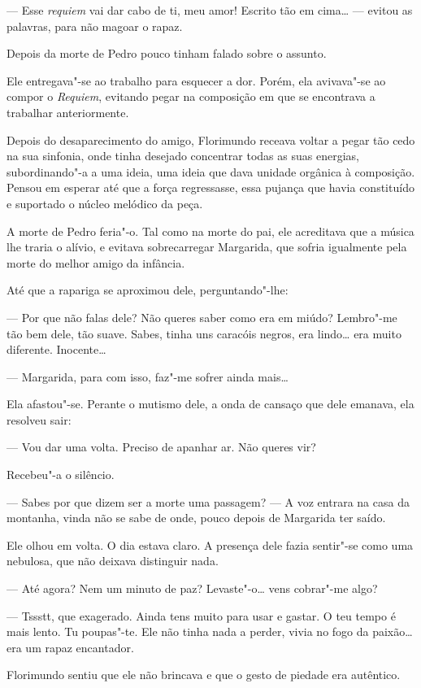 --- Esse \emph{requiem }vai dar cabo de ti, meu amor! Escrito tão em
cima\ldots{} --- evitou as palavras, para não magoar o rapaz.

Depois da morte de Pedro pouco tinham falado sobre o assunto.

Ele entregava"-se ao trabalho para esquecer a dor. Porém, ela avivava"-se
ao compor o \emph{Requiem}, evitando pegar na composição em que se
encontrava a trabalhar anteriormente.

Depois do desaparecimento do amigo, Florimundo receava voltar a pegar
tão cedo na sua sinfonia, onde tinha desejado concentrar todas as suas
energias, subordinando"-a a uma ideia, uma ideia que dava unidade
orgânica à composição. Pensou em esperar até que a força regressasse,
essa pujança que havia constituído e suportado o núcleo melódico da
peça.

A morte de Pedro feria"-o. Tal como na morte do pai, ele acreditava que a
música lhe traria o alívio, e evitava sobrecarregar Margarida, que
sofria igualmente pela morte do melhor amigo da infância.

Até que a rapariga se aproximou dele, perguntando"-lhe:

--- Por que não falas dele? Não queres saber como era em miúdo? Lembro"-me
tão bem dele, tão suave. Sabes, tinha uns caracóis negros, era
lindo\ldots{} era muito diferente. Inocente\ldots{}

--- Margarida, para com isso, faz"-me sofrer ainda mais\ldots{}

Ela afastou"-se. Perante o mutismo dele, a onda de cansaço que dele
emanava, ela resolveu sair:

--- Vou dar uma volta. Preciso de apanhar ar. Não queres vir?

Recebeu"-a o silêncio.

--- Sabes por que dizem ser a morte uma passagem? --- A voz entrara na casa
da montanha, vinda não se sabe de onde, pouco depois de Margarida ter
saído.

Ele olhou em volta. O dia estava claro. A presença dele fazia sentir"-se
como uma nebulosa, que não deixava distinguir nada.

--- Até agora? Nem um minuto de paz? Levaste"-o\ldots{} vens cobrar"-me algo?

--- Tssstt, que exagerado. Ainda tens muito para usar e gastar. O teu
tempo é mais lento. Tu poupas"-te. Ele não tinha nada a perder, vivia no
fogo da paixão\ldots{} era um rapaz encantador.

Florimundo sentiu que ele não brincava e que o gesto de piedade era
autêntico.

